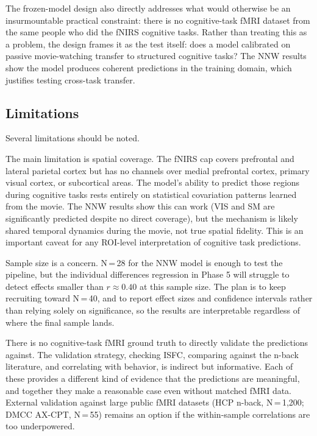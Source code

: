 The frozen-model design also directly addresses what would otherwise be an insurmountable practical constraint: there is no cognitive-task fMRI dataset from the same people who did the fNIRS cognitive tasks. Rather than treating this as a problem, the design frames it as the test itself: does a model calibrated on passive movie-watching transfer to structured cognitive tasks? The NNW results show the model produces coherent predictions in the training domain, which justifies testing cross-task transfer.

\subsection{Limitations}

Several limitations should be noted.

The main limitation is spatial coverage. The fNIRS cap covers prefrontal and lateral parietal cortex but has no channels over medial prefrontal cortex, primary visual cortex, or subcortical areas. The model's ability to predict those regions during cognitive tasks rests entirely on statistical covariation patterns learned from the movie. The NNW results show this can work (VIS and SM are significantly predicted despite no direct coverage), but the mechanism is likely shared temporal dynamics during the movie, not true spatial fidelity. This is an important caveat for any ROI-level interpretation of cognitive task predictions.

Sample size is a concern. N\,=\,28 for the NNW model is enough to test the pipeline, but the individual differences regression in Phase 5 will struggle to detect effects smaller than $r \approx 0.40$ at this sample size. The plan is to keep recruiting toward N\,=\,40, and to report effect sizes and confidence intervals rather than relying solely on significance, so the results are interpretable regardless of where the final sample lands.

There is no cognitive-task fMRI ground truth to directly validate the predictions against. The validation strategy, checking ISFC, comparing against the n-back literature, and correlating with behavior, is indirect but informative. Each of these provides a different kind of evidence that the predictions are meaningful, and together they make a reasonable case even without matched fMRI data. External validation against large public fMRI datasets (HCP n-back, N\,=\,1,200; DMCC AX-CPT, N\,=\,55) remains an option if the within-sample correlations are too underpowered.

